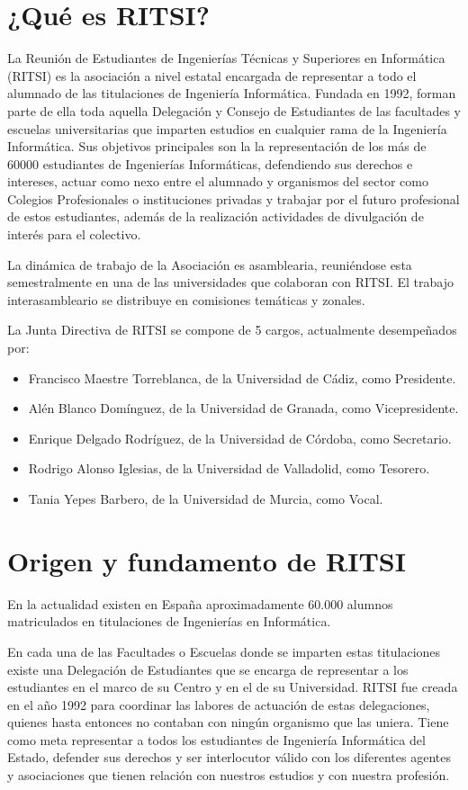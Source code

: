 \documentclass[11pt]{ritsi/article}
\begin{document}
\section{¿Qué es RITSI?}
La Reunión de Estudiantes de Ingenierías Técnicas y Superiores en Informática (RITSI) es la asociación a nivel estatal encargada de representar a todo el alumnado de las titulaciones de Ingeniería Informática. Fundada en 1992, forman parte de ella toda aquella Delegación y Consejo de Estudiantes de las facultades y escuelas universitarias que imparten estudios en cualquier rama de la Ingeniería Informática. Sus objetivos principales son la la representación de los más de 60000 estudiantes de Ingenierías Informáticas, defendiendo sus derechos e intereses, actuar como nexo entre el alumnado y organismos del sector como Colegios Profesionales o instituciones privadas y trabajar por el futuro profesional de estos estudiantes, además de la realización actividades de divulgación de interés para el colectivo.

La dinámica de trabajo de la Asociación es asamblearia, reuniéndose esta semestralmente en una de las universidades que colaboran con RITSI. El trabajo interasambleario se distribuye en comisiones temáticas y zonales.

La Junta Directiva de RITSI se compone de 5 cargos, actualmente desempeñados por:
\begin{itemize}
    \item Francisco Maestre Torreblanca, de la Universidad de Cádiz, como Presidente.
    \item Alén Blanco Domínguez, de la Universidad de Granada, como Vicepresidente.
    \item Enrique Delgado Rodríguez, de la Universidad de Córdoba, como Secretario.
    \item Rodrigo Alonso Iglesias, de la Universidad de Valladolid, como Tesorero.
    \item Tania Yepes Barbero, de la Universidad de Murcia, como Vocal.
\end{itemize}
 
\section{Origen y fundamento de RITSI}

En la actualidad existen en España aproximadamente 60.000 alumnos matriculados en titulaciones de Ingenierías en Informática.

En cada una de las Facultades o Escuelas donde se imparten estas titulaciones existe una Delegación de Estudiantes que se encarga de representar a los estudiantes en el marco de su Centro y en el de su Universidad. RITSI fue creada en el año 1992 para coordinar las labores de actuación de estas delegaciones, quienes hasta entonces no contaban con ningún organismo que las uniera. Tiene como meta representar a todos los estudiantes de Ingeniería Informática del Estado, defender sus derechos y ser interlocutor válido con los diferentes agentes y asociaciones que tienen relación con nuestros estudios y con nuestra profesión.
\end{document}
